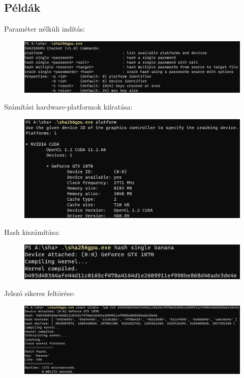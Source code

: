 \subsection{Példák}

Paraméter nélküli indítás:
%
\begin{figure}[H]
    \centering
    \includegraphics[width=\textwidth]{images/examples/example-empty.png}
\end{figure}

Számítási hardware-platformok kiíratása:
%
\begin{figure}[H]
    \centering
    \includegraphics[width=\textwidth]{images/examples/example-platform.png}
\end{figure}

Hash kiszámítása:
%
\begin{figure}[H]
    \centering
    \includegraphics[width=\textwidth]{images/examples/example-hash.png}
\end{figure}

Jelszó sikeres feltörése:
%
\begin{figure}[H]
    \centering
    \includegraphics[width=\textwidth]{images/examples/example-crack.png}
\end{figure}

